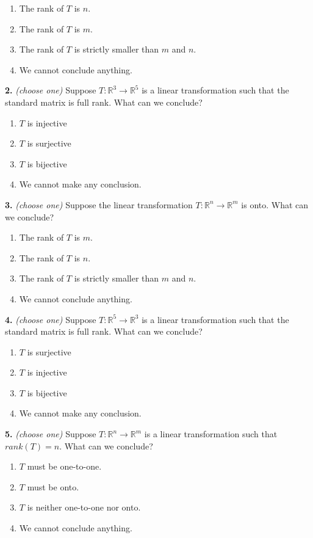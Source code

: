 \documentclass[10pt,a4paper]{article}
\begin{document}
\begin{enumerate}[label=(\Alph*)]
\item The rank of \(T\) is \(n\).
\item The rank of \(T\) is \(m\).
\item The rank of \(T\) is strictly smaller than \(m\) and \(n\).
\item We cannot conclude anything.
\end{enumerate}
\smallskip
\textbf{2.} \textit{(choose one)} Suppose \(T:\mathbb{R}^3\to\mathbb{R}^5\) is a linear transformation such that the standard matrix is full rank. What can we conclude?

\begin{enumerate}[label=(\Alph*)]
\item \(T\) is injective
\item \(T\) is surjective
\item \(T\) is bijective
\item We cannot make any conclusion.
\end{enumerate}
\smallskip
\textbf{3.} \textit{(choose one)} Suppose the linear transformation \(T:\mathbb{R}^n\to\mathbb{R}^m\) is onto. What can we conclude?

\begin{enumerate}[label=(\Alph*)]
\item The rank of \(T\) is \(m\).
\item The rank of \(T\) is \(n\).
\item The rank of \(T\) is strictly smaller than \(m\) and \(n\).
\item We cannot conclude anything.
\end{enumerate}
\smallskip
\textbf{4.} \textit{(choose one)} Suppose \(T:\mathbb{R}^5\to\mathbb{R}^3\) is a linear transformation such that the standard matrix is full rank. What can we conclude?

\begin{enumerate}[label=(\Alph*)]
\item \(T\) is surjective
\item \(T\) is injective
\item \(T\) is bijective
\item We cannot make any conclusion.
\end{enumerate}
\smallskip
\textbf{5.} \textit{(choose one)} Suppose \(T:\mathbb{R}^n\to\mathbb{R}^m\) is a linear transformation such that \(rank(T)=n\). What can we conclude?

\begin{enumerate}[label=(\Alph*)]
\item \(T\) must be one-to-one.
\item \(T\) must be onto.
\item \(T\) is neither one-to-one nor onto.
\item We cannot conclude anything.
\end{enumerate}
\smallskip
\end{document}
